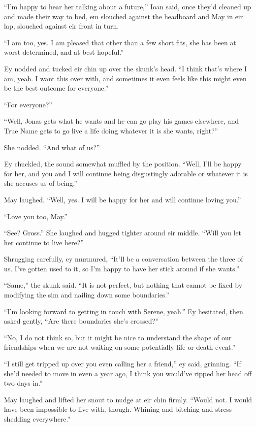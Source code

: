 ``I'm happy to hear her talking about a future,'' Ioan said, once they'd cleaned up and made their way to bed, em slouched against the headboard and May in eir lap, slouched against eir front in turn.

``I am too, yes. I am pleased that other than a few short fits, she has been at worst determined, and at best hopeful.''

Ey nodded and tucked eir chin up over the skunk's head. ``I think that's where I am, yeah. I want this over with, and sometimes it even feels like this might even be the best outcome for everyone.''

``For everyone?''

``Well, Jonas gets what he wants and he can go play his games elsewhere, and True Name gets to go live a life doing whatever it is she wants, right?''

She nodded. ``And what of us?''

Ey chuckled, the sound somewhat muffled by the position. ``Well, I'll be happy for her, and you and I will continue being disgustingly adorable or whatever it is she accuses us of being.''

May laughed. ``Well, yes. I will be happy for her and will continue loving you.''

``Love you too, May.''

``See? Gross.'' She laughed and hugged tighter around eir middle. ``Will you let her continue to live here?''

Shrugging carefully, ey murmured, ``It'll be a conversation between the three of us. I've gotten used to it, so I'm happy to have her stick around if she wants.''

``Same,'' the skunk said. ``It is not perfect, but nothing that cannot be fixed by modifying the sim and nailing down some boundaries.''

``I'm looking forward to getting in touch with Serene, yeah.'' Ey hesitated, then asked gently, ``Are there boundaries she's crossed?''

``No, I do not think so, but it might be nice to understand the shape of our friendships when we are not waiting on some potentially life-or-death event.''

``I still get tripped up over you even calling her a friend,'' ey said, grinning. ``If she'd needed to move in even a year ago, I think you would've ripped her head off two days in.''

May laughed and lifted her snout to nudge at eir chin firmly. ``Would not. I would have been impossible to live with, though. Whining and bitching and stress-shedding everywhere.''

